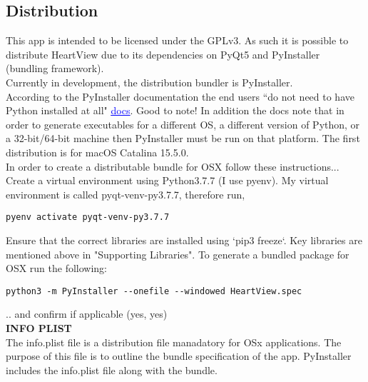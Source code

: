 \documentclass[11pt,fleqn]{book} %
\begin{document}
\subsection{Distribution}

This app is intended to be licensed under the GPLv3. As such it is possible to distribute HeartView due to its dependencies on PyQt5 and PyInstaller (bundling framework).\\

Currently in development, the distribution bundler is PyInstaller.\\

According to the PyInstaller documentation the end users ``do not need to have Python installed at all" \href{https://readthedocs.org/projects/pyinstaller/downloads/pdf/latest/}{\textcolor{blue}{\underline{docs}}}. Good to note! In addition the docs note that in order to generate executables for a different OS, a different version of Python, or a 32-bit/64-bit machine then PyInstaller must be run on that platform. The first distribution is for macOS Catalina 15.5.0.\\

In order to create a distributable bundle for OSX follow these instructions...\\

Create a virtual environment using Python3.7.7 (I use pyenv). My virtual environment is called pyqt-venv-py3.7.7, therefore run, \\

\begin{verbatim}pyenv activate pyqt-venv-py3.7.7 \end{verbatim}

Ensure that the correct libraries are installed using `pip3 freeze`. Key libraries are mentioned above in "Supporting Libraries". To generate a bundled package for OSX run the following: 

\begin{verbatim}python3 -m PyInstaller --onefile --windowed HeartView.spec \end{verbatim}

.. and confirm if applicable (yes, yes)\\

\textbf{INFO PLIST}\\

The info.plist file is a distribution file manadatory for OSx applications. The purpose of this file is to outline the bundle specification of the app. PyInstaller includes the info.plist file along with the bundle.
\end{document}
